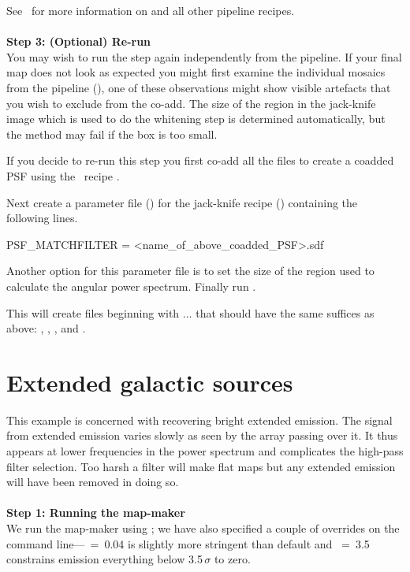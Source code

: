 See \pipelinesun\ for more information on
 and all other pipeline
recipes.
\\ \\
\textbf{Step 3: (Optional) Re-run }\\
You may wish to run the  step again
independently from the pipeline. If your final map does not look as
expected you might first examine the individual mosaics from the
pipeline (), one of these observations might show visible
artefacts that you wish to exclude from the co-add. The size of the
region in the jack-knife image which is used to do the whitening step
is determined automatically, but the method may fail if the box is too
small.

If you decide to re-run this step you first co-add all the
 files to create a coadded PSF using the \picard\ recipe
.
\begin{terminalv}
\end{terminalv}
Next create a parameter file () for the jack-knife
recipe () containing the following lines.
\begin{terminalv}
PSF_MATCHFILTER = <name_of_above_coadded_PSF>.sdf
\end{terminalv}
Another option for this parameter file is  to set the
size of the region used to calculate the angular power spectrum.
Finally run .
\begin{terminalv}
\end{terminalv}
This will create files beginning with $\ldots$ that
should have the same suffices as above: ,
, , and .



\section{Extended galactic sources}
\label{sec:bright_ex}

This example is concerned with recovering bright extended emission.
The signal from extended emission varies slowly as seen by the array
passing over it. It thus appears at lower frequencies in the power
spectrum and complicates the high-pass filter selection. Too harsh a
filter will make flat maps but any extended emission will have been
removed in doing so.
\\ \\
\textbf{Step 1: Running the map-maker}
\vspace{0.2cm}\\
We run the map-maker using ;
we have also specified a couple of overrides on the command
line---~=~0.04 is slightly more stringent than default and
~=~3.5 constrains emission everything below
3.5\,$\sigma$ to zero.

